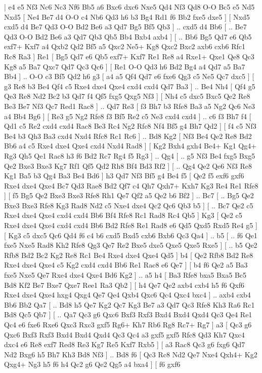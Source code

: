 \makegametitle

| e4   e5    Nf3   Nc6    Nc3   Nf6    Bb5   a6    Bxc6   dxc6    Nxe5   Qd4    Nf3   Qd8    O-O   Bc5    e5   Nd5    Nxd5 [  Ne4 Be7  d4 O-O  c4 Nb6  Qd3 h6  b3 Bg4  Rd1 f6  Bb2 fxe5  dxe5   ]  [  Nxd5 cxd5  d4 Be7  Qd3 O-O  Bd2 Be6  a3 Qd7  Bg5 Bf5  Qb3   ] .. cxd5    d4   Bb6 [ .. Be7  Qd3 O-O  Bd2 Be6  a3 Qd7  Qb3 Qb5  Bb4 Bxb4  axb4   ]  [ .. Bb6  Bg5 Qd7  e6 Qb5  exf7+ Kxf7  a4 Qxb2  Qd2 Bf5  a5 Qxc2  Ne5+ Kg8  Qxc2 Bxc2  axb6 cxb6  Rfc1 Rc8  Ra3   ]  Re1 [  Bg5 Qd7  e6 Qb5  exf7+ Kxf7  Re1 Re8  a4 Rxe1+  Qxe1 Qe8  Qc3 Kg8  a5 Ba7  Qxc7 Qd7  Qc3 Qc6   ]  [  Re1 O-O  Qd3 h6  Bd2 Bg4  a4 Qd7  a5 Ba7  Bb4   ] .. O-O    c3   Bf5    Qd2   h6    g3 [  a4 a5  Qf4 Qd7  e6 fxe6  Qg3 c5  Ne5 Qc7  dxc5   ]  [  g3 Re8  b3 Be4  Qf4 c5  Rxe4 dxe4  Qxe4 cxd4  cxd4 Qd7  Ba3   ] .. Be4    Nh4 [  Qf4 g5  Qe3 Re8  Nd2 Bc2  b3 Qd7  f4 Qf5  fxg5 Qxg5  Nf3   ]  [  Nh4 c5  dxc5 Bxc5  Qe2 Re8  Be3 Be7  Nf3 Qc7  Red1 Rac8   ] .. Qd7    Re3 [  f3 Bh7  b3 Rfe8  Ba3 a5  Ng2 Qc6  Ne3 a4  Bb4 Bg6   ]  [  Re3 g5  Ng2 Rfe8  f3 Bf5  Re2 c5  Ne3 cxd4  cxd4   ] .. c6    f3   Bh7    f4 [  Qd1 c5  Re2 cxd4  cxd4 Rac8  Be3 Rc4  Ng2 Rfc8  Nf4 Bf5  g4 Bh7  Qd2   ]  [  f4 c5  Nf3 Be4  b3 Qh3  Ba3 cxd4  Nxd4 Rfc8  Rc1 Rc6   ] .. Bd8    Kg2 [  Nf3 Be4  Qe2 Re8  Bd2 Bb6  a4 c5  Rxe4 dxe4  Qxe4 cxd4  Nxd4 Rad8   ]  [  Kg2 Bxh4  gxh4 Be4+  Kg1 Qg4+  Rg3 Qh5  Qe1 Rac8  h3 f6  Bd2 Rc7  Rg4 f5  Rg3   ] .. Qg4 [ .. g5  Nf3 Be4  fxg5 Bxg5  Qe2 Bxe3  Bxe3 Kg7  Rf1 Qf5  Qd2 Rh8  Bf4 Bd3  Rf2   ]  [ .. Qg4  Qe2 Qe6  Nf3 Re8  Kg1 Ba5  b3 Qg4  Ba3 Be4  Bd6   ]  h3   Qd7    Nf3   Bf5    g4   Be4    f5 [  Qe2 f5  exf6 gxf6  Rxe4 dxe4  Qxe4 Bc7  Qd3 Rae8  Bd2 Qf7  c4 Qh7  Qxh7+ Kxh7  Kg3 Re4  Re1 Rfe8   ]  [  f5 Bg5  Qe2 Bxe3  Bxe3 Rfe8  Rh1 Qe7  Qf2 a5  Qe2 b6  Bf2   ] .. Bc7 [ .. Bg5  Qe2 Bxe3  Bxe3 Rfe8  Kg3 Rad8  Nd2 c5  Nxe4 dxe4  Qc2 Qc6  Qb3 b5   ]  [ .. Bc7  Qe2 c5  Rxe4 dxe4  Qxe4 cxd4  cxd4 Bb6  Bf4 Rfe8  Rc1 Rad8  Rc4 Qb5   ]  Kg3 [  Qe2 c5  Rxe4 dxe4  Qxe4 cxd4  cxd4 Bb6  Bd2 Rfe8  Re1 Rad8  e6 Qd5  Qxd5 Rxd5  Re4 g5   ]  [  Kg3 c5  dxc5 Qc6  Qd4 f6  c4 b6  cxd5 Bxd5  cxb6 Bxb6  Qc3 Qa4   ] .. b5 [ .. f6  Qe1 fxe5  Nxe5 Rad8  Kh2 Rfe8  Qg3 Qe7  Re2 Bxe5  dxe5 Qxe5  Qxe5 Rxe5   ]  [ .. b5  Qe2 Rfb8  Bd2 Bc2  Kg2 Re8  Rc1 Be4  Rxe4 dxe4  Qxe4 Qd5   ]  b4 [  Qe2 Rfb8  Bd2 Re8  Rxe4 dxe4  Qxe4 c5  Kg2 cxd4  cxd4 Bb6  Re1 Rac8  e6 Qe7   ]  [  b4 f6  Qe2 a5  Ba3 fxe5  Nxe5 Qe7  Rxe4 dxe4  Qxe4 Bd6  Kg2   ] .. a5    h4 [  Ba3 Rfe8  bxa5 Bxa5  Bc5 Bd8  Kf2 Be7  Bxe7 Qxe7  Ree1 Ra3  Qb2   ]  [  h4 Qe7  Qe2 axb4  cxb4 h5  f6 Qxf6  Rxe4 dxe4  Qxe4 hxg4  Qxg4 Qe7  Qe4 Qxb4  Qxc6 Qc4  Qxc4 bxc4   ] .. axb4    cxb4   Bb6    Bb2   Qa7 [ .. Bd8  h5 Qe7  Kg2 Qc7  Kg3 Be7  a3 Qd7  Qc3 Rfe8  Kh3 Ra6  Rc1 Bd8  Qc5 Qb7   ]  [ .. Qa7  Qc3 g6  Qxc6 Bxf3  Rxf3 Bxd4  Bxd4 Qxd4  Qc3 Qe4  Re1 Qc4  e6 fxe6  Rxe6 Qxc3  Rxc3 gxf5  Rg6+ Kh7  Rb6 Rg8  Rc7+ Rg7   ]  a3 [  Qc3 g6  Qxc6 Bxf3  Rxf3 Bxd4  Bxd4 Qxd4  Qc3 Qc4  a3 gxf5  gxf5 Rfc8  Qd3 Kh7  Qxc4 dxc4  e6 Re8  exf7 Red8  Re3 Kg7  Re5 Kxf7  Rxb5   ]  [  a3 Rac8  Qc3 g6  fxg6 Qd7  Nd2 Bxg6  h5 Bh7  Kh3 Bd8  Nf3   ] .. Bd8    f6 [  Qc3 Rc8  Nd2 Qe7  Nxe4 Qxh4+  Kg2 Qxg4+  Ng3 h5  f6 h4  Qc2 g6  Qe2 Qg5  a4 bxa4   ]  [  f6 gxf6  